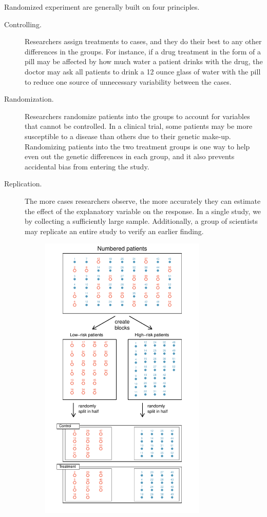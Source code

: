 Randomized experiment are generally built on four principles.
\begin{description}
\item[Controlling.] Researchers assign treatments to cases, and they do their best to  any other differences in the groups. For instance, if a drug treatment in the form of a pill may be affected by how much water a patient drinks with the drug, the doctor may ask all patients to drink a 12 ounce glass of water with the pill to reduce one source of unnecessary variability between the cases.
\item[Randomization.] Researchers randomize patients into the groups to account for variables that cannot be controlled. In a clinical trial, some patients may be more susceptible to a disease than others due to their genetic make-up. Randomizing patients into the two treatment groups is one way to help even out the genetic differences in each group, and it also prevents accidental bias from entering the study.
\item[Replication.] The more cases researchers observe, the more accurately they can estimate the effect of the explanatory variable on the response. In a single study, we  by collecting a sufficiently large sample. Additionally, a group of scientists may replicate an entire study to verify an earlier finding.
\begin{figure}
\centering
\includegraphics[width=0.78\textwidth]{01/figures/figureShowingBlocking/figureShowingBlocking}

\end{figure}
\end{description}

